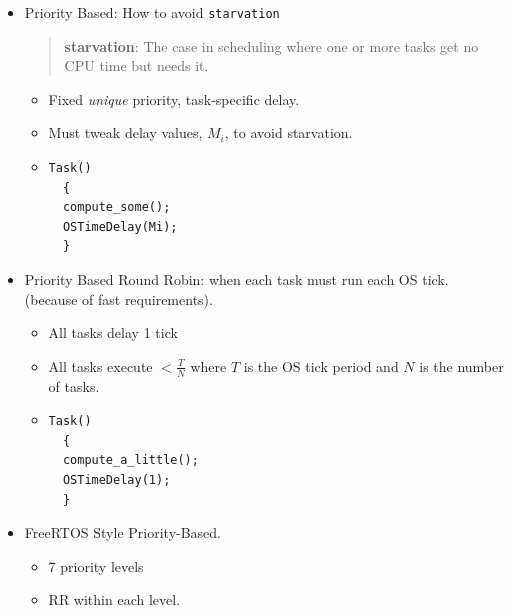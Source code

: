 \begin{itemize}
RMS Schedulability:

$C_i = $ execution time of task $i$.

$P_i = $ period of task $i$.

$n = $ number of tasks.

if 

\[
\sum^{n-1}_{i=0}\frac{C_i}{P_i} \leq n(2^{1/n}-1)
\]
the system {\bf is} schedulable using RMS.

Assumption:  All tasks pre-emptable 100\% of the time.

        \item 	%
Priority Based: How to avoid {\tt starvation}

\begin{quotation}
{\bf starvation}: The case in scheduling where one or more tasks get no CPU time but needs it.
\end{quotation}

        \begin{itemize}
                \item Fixed {\it unique} priority, task-specific delay.
                \item Must tweak delay values, $M_i$,  to avoid
starvation.                \item \begin{verbatim}
Task()
  {
  compute_some();
  OSTimeDelay(Mi);
  }
\end{verbatim}
        \end{itemize}


       \item	%
 Priority Based Round Robin: when each task must run each OS tick.  (because of fast requirements).
        \begin{itemize}
                \item All tasks delay 1 tick
                \item All tasks execute $< \frac{T}{N}$ where $T$ is the
                OS tick period and $N$ is the number of tasks.
                \item  \begin{verbatim}
Task()
  {
  compute_a_little();
  OSTimeDelay(1);
  }
\end{verbatim}
        \end{itemize}

 \item	%
FreeRTOS Style Priority-Based. 
             \begin{itemize}
                \item 7 priority levels
		\item RR within each level.
              \end{itemize}

\end{itemize}	%

